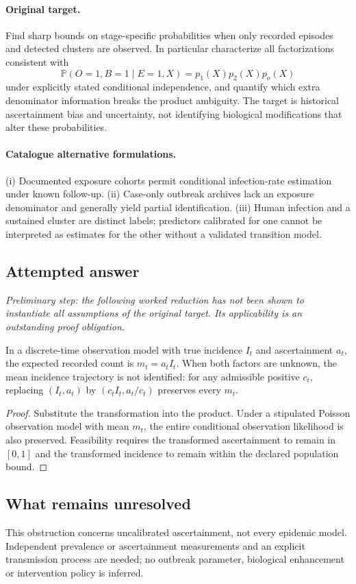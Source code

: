 \documentclass[11pt]{article}
\begin{document}
\paragraph{Original target.}
Find sharp bounds on stage-specific probabilities when only recorded episodes and detected clusters are observed. In particular characterize all factorizations consistent with
    \[\mathbb{P}(O=1,B=1\mid E=1,X)=p_1(X)p_2(X)p_o(X)\]
    under explicitly stated conditional independence, and quantify which extra denominator information breaks the product ambiguity. The target is historical ascertainment bias and uncertainty, not identifying biological modifications that alter these probabilities.
\paragraph{Catalogue alternative formulations.}
(i) Documented exposure cohorts permit conditional infection-rate estimation under known follow-up. (ii) Case-only outbreak archives lack an exposure denominator and generally yield partial identification. (iii) Human infection and a sustained cluster are distinct labels; predictors calibrated for one cannot be interpreted as estimates for the other without a validated transition model.
\subsection{Attempted answer}
\noindent\emph{Preliminary step: the following worked reduction has not been shown to instantiate all assumptions of the original target. Its applicability is an outstanding proof obligation.}

\begin{proposition}
In a discrete-time observation model with true incidence $I_t$ and ascertainment $a_t$, the expected recorded count is $m_t=a_tI_t$. When both factors are unknown, the mean incidence trajectory is not identified: for any admissible positive $c_t$, replacing $(I_t,a_t)$ by $(c_tI_t,a_t/c_t)$ preserves every $m_t$.
\end{proposition}
\begin{proof}
Substitute the transformation into the product. Under a stipulated Poisson observation model with mean $m_t$, the entire conditional observation likelihood is also preserved. Feasibility requires the transformed ascertainment to remain in $[0,1]$ and the transformed incidence to remain within the declared population bound.
\end{proof}
\subsection{What remains unresolved}
This obstruction concerns uncalibrated ascertainment, not every epidemic model. Independent prevalence or ascertainment measurements and an explicit transmission process are needed; no outbreak parameter, biological enhancement or intervention policy is inferred.
\end{document}
